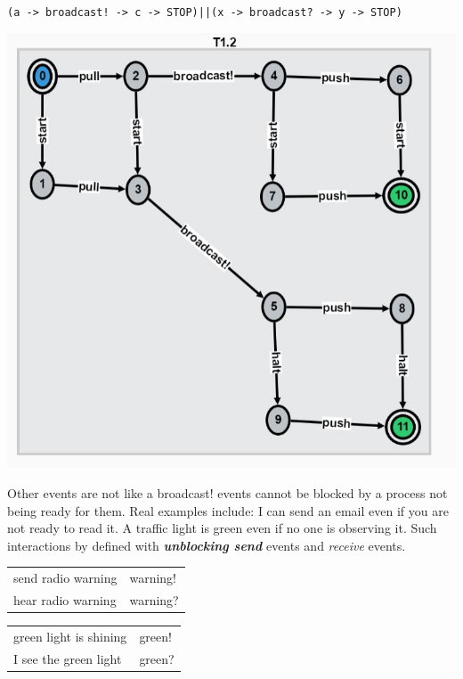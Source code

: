 \documentclass[]{article}
\begin{document}
\begin{center}\verb$(a -> broadcast! -> c -> STOP)||(x -> broadcast? -> y -> STOP)$

	\includegraphics[scale=0.5]{bcast.jpg} \end{center}




Other events are not like a {\sf broadcast!}  events cannot be blocked by a process not being ready for them. Real examples include:  I can send an email even if you are not ready to read it. A traffic light  is green even if no one is observing it.  Such interactions  by defined with  \emph{\bf unblocking send} events and \emph{receive} events.

\hspace{\fill}
\begin{tabular}{ll}
send radio warning & {\sf warning!} \\
hear radio warning & {\sf warning?}
\end{tabular} \hspace{\fill}
\begin{tabular}{ll}
green light is shining  & {\sf green!} \\
I see the green light & {\sf green?}
\end{tabular}
\hspace{\fill}
\end{document}

